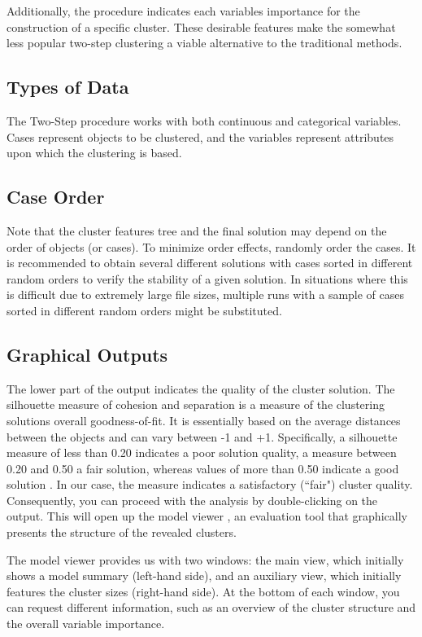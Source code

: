 \documentclass[a4paper,12pt]{report}
\begin{document}
Additionally, the procedure indicates each variables importance for the construction of a specific cluster. These desirable features make the somewhat less popular two-step clustering a viable alternative to the traditional
methods.


\subsection{Types of Data} The Two-Step procedure works with both continuous and categorical variables. Cases represent objects to be clustered, and the variables represent attributes upon which the clustering is based.

\subsection{Case Order}
Note that the cluster features tree and the final solution may depend on the order of objects (or cases). To minimize order effects, randomly order the cases. It is recommended to obtain several different solutions with cases sorted in different random orders to verify the stability of a given solution. In situations where this is difficult due to extremely large file sizes, multiple runs with a sample of cases sorted in different random orders might be substituted.


\subsection{Graphical Outputs}
The lower part of the output indicates the quality of the cluster
solution. The silhouette measure of cohesion and separation is a measure of the
clustering solutions overall goodness-of-fit. It is essentially based on the average
distances between the objects and can vary between -1 and +1. Specifically, a
silhouette measure of less than 0.20 indicates a poor solution quality, a measure
between 0.20 and 0.50 a fair solution, whereas values of more than 0.50 indicate a
good solution . In our case, the measure indicates a satisfactory (``fair") cluster quality. Consequently, you can
proceed with the analysis by double-clicking on the output. This will open up the
model viewer , an evaluation tool that graphically presents the structure
of the revealed clusters.


The model viewer provides us with two windows: the main view, which initially
shows a model summary (left-hand side), and an auxiliary view, which initially
features the cluster sizes (right-hand side). At the bottom of each window, you can
request different information, such as an overview of the cluster structure and the
overall variable importance.
\end{document}
